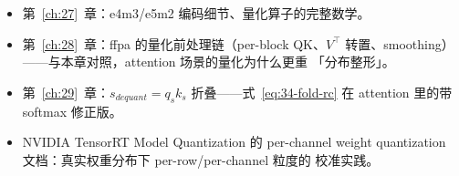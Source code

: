 \begin{itemize}[itemsep=1pt,topsep=2pt]
  \item 第~\ref{ch:27}~章：e4m3/e5m2 编码细节、量化算子的完整数学。
  \item 第~\ref{ch:28}~章：ffpa 的量化前处理链（per-block QK、$V^{\top}$
        转置、smoothing）——与本章对照，attention 场景的量化为什么更重
        「分布整形」。
  \item 第~\ref{ch:29}~章：$s_{dequant}=q_sk_s$ 折叠——式~\ref{eq:34-fold-rc}
        在 attention 里的带 softmax 修正版。
  \item NVIDIA TensorRT Model Quantization 的 per-channel weight
        quantization 文档：真实权重分布下 per-row/per-channel 粒度的
        校准实践。
\end{itemize}
